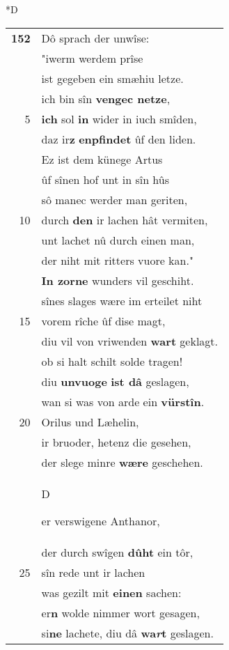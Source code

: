 \documentclass[8pt,a4paper,notitlepage]{article}
\begin{document}
\begin{table}[ht]
\begin{minipage}[t]{0.5\linewidth}
\small
\begin{center}*D
\end{center}
\begin{tabular}{rl}
\textbf{152} & Dô sprach der unwîse:\\ 
 & "iwerm werdem prîse\\ 
 & ist gegeben ein smæhiu letze.\\ 
 & ich bin sîn \textbf{vengec netze},\\ 
5 & \textbf{ich} sol \textbf{in} wider in iuch smîden,\\ 
 & daz ir\textbf{z} \textbf{enpfindet} ûf den liden.\\ 
 & Ez ist dem künege Artus\\ 
 & ûf sînen hof unt in sîn hûs\\ 
 & sô manec werder man geriten,\\ 
10 & durch \textbf{den} ir lachen hât vermiten,\\ 
 & unt lachet nû durch einen man,\\ 
 & der niht mit ritters vuore kan."\\ 
 & \textbf{In zorne} wunders vil geschiht.\\ 
 & sînes slages wære im erteilet niht\\ 
15 & vorem rîche ûf dise magt,\\ 
 & diu vil von vriwenden \textbf{wart} geklagt.\\ 
 & ob si halt schilt solde tragen!\\ 
 & diu \textbf{unvuoge} \textbf{ist dâ} geslagen,\\ 
 & wan si was von arde ein \textbf{vürstîn}.\\ 
20 & Orilus und Læhelin,\\ 
 & ir bruoder, hetenz die gesehen,\\ 
 & der slege minre \textbf{wære} geschehen.\\ 
 & \begin{large}D\end{large}er verswigene Anthanor,\\ 
 & der durch swîgen \textbf{dûht} ein tôr,\\ 
25 & sîn rede unt ir lachen\\ 
 & was gezilt mit \textbf{einen} sachen:\\ 
 & er\textbf{n} wolde nimmer wort gesagen,\\ 
 & si\textbf{ne} lachete, diu dâ \textbf{wa\textit{r}t} geslagen.\\ 

\end{tabular}
\end{minipage}
\end{table}
\end{document}
